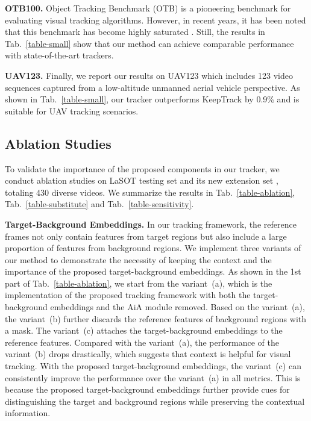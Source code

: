 \documentclass[runningheads]{llncs}
\begin{document}
\noindent\textbf{OTB100.} Object Tracking Benchmark (OTB) \cite{wu2015object} is a pioneering benchmark for evaluating visual tracking algorithms. However, in recent years, it has been noted that this benchmark has become highly saturated \cite{wang2021transformer,yan2021learning,mayer2021learning}. Still, the results in Tab.~\ref{table-small} show that our method can achieve comparable performance with state-of-the-art trackers.

\noindent\textbf{UAV123.} Finally, we report our results on UAV123 \cite{mueller2016benchmark} which includes 123 video sequences captured from a low-altitude unmanned aerial vehicle perspective. As shown in Tab.~\ref{table-small}, our tracker outperforms KeepTrack \cite{mayer2021learning} by 0.9\% and is suitable for UAV tracking scenarios.

\subsection{Ablation Studies}\label{section-ablation}
To validate the importance of the proposed components in our tracker, we conduct ablation studies on LaSOT testing set and its new extension set \cite{fan2021lasot}, totaling 430 diverse videos. We summarize the results in Tab.~\ref{table-ablation}, Tab.~\ref{table-substitute} and Tab.~\ref{table-sensitivity}.

\noindent\textbf{Target-Background Embeddings.} In our tracking framework, the reference frames not only contain features from target regions but also include a large proportion of features from background regions. We implement three variants of our method to demonstrate the necessity of keeping the context and the importance of the proposed target-background embeddings. As shown in the 1st part of Tab.~\ref{table-ablation}, we start from the variant~(a), which is the implementation of the proposed tracking framework with both the target-background embeddings and the AiA module removed. Based on the variant~(a), the variant~(b) further discards the reference features of background regions with a mask. The variant~(c) attaches the target-background embeddings to the reference features. Compared with the variant~(a), the performance of the variant~(b) drops drastically, which suggests that context is helpful for visual tracking. With the proposed target-background embeddings, the variant~(c) can consistently improve the performance over the variant~(a) in all metrics. This is because the proposed target-background embeddings further provide cues for distinguishing the target and background regions while preserving the contextual information.
\end{document}
